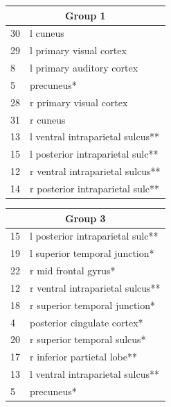 \documentclass[11pt]{article}
\begin{document}
\begin{minipage}{.5\textwidth}
\begin{tabular}{ll}
\multicolumn{2}{c}{Group 1}\\
\hline
30 & l cuneus\\
29 & l primary visual cortex\\
8 & l primary auditory cortex\\
5 & precuneus*\\
28 & r primary visual cortex\\
31 & r cuneus\\
13 & l ventral intraparietal sulcus**\\
15 & l posterior intraparietal sulc**\\
12 & r ventral intraparietal sulcus**\\
14 & r posterior intraparietal sulc**\\
\end{tabular}
\end{minipage}
\begin{minipage}{.5\textwidth}
\begin{tabular}{ll}
\multicolumn{2}{c}{Group 3}\\
\hline
15 & l posterior intraparietal sulc**\\
19 & l superior temporal junction*\\
22 & r mid frontal gyrus*\\
12 & r ventral intraparietal sulcus**\\
18 & r superior temporal junction*\\
4 & posterior cingulate cortex*\\
20 & r superior temporal sulcus*\\
17 & r inferior partietal lobe**\\
13 & l ventral intraparietal sulcus**\\
5 & precuneus*\\
\end{tabular}
\end{minipage}
\vspace{10pt}
\end{document}
